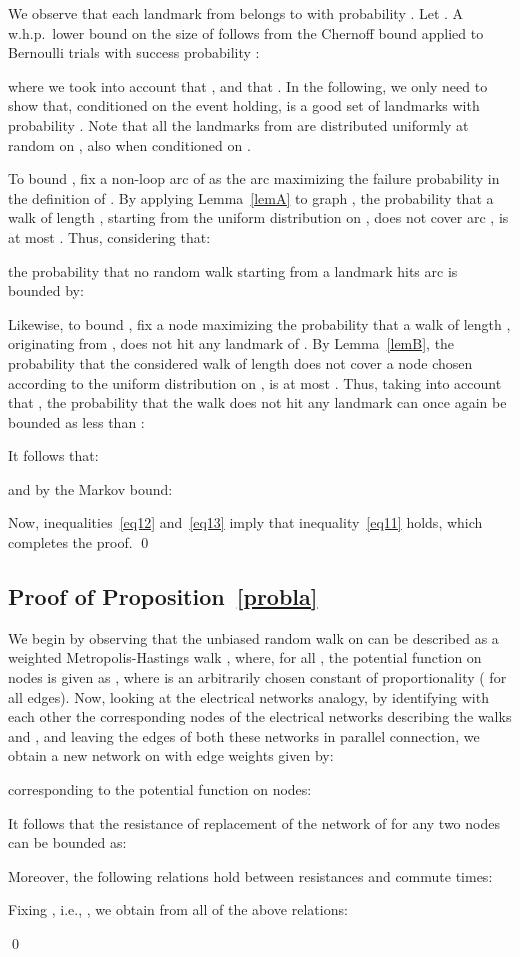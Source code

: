 \documentclass[11pt,a4paper]{article}
\renewcommand{\*}{\hspace*{5mm}}
\begin{document}
We observe that each landmark from  belongs to  with probability . Let . A w.h.p.\ lower bound on the size of  follows from the Chernoff bound applied to  Bernoulli trials with success probability :

where we took into account that , and that . In the following, we only need to show that, conditioned on the event  holding,  is a good set of landmarks with probability . Note that all the landmarks from  are distributed uniformly at random on , also when conditioned on .

To bound , fix a non-loop arc  of  as the arc maximizing the failure probability in the definition of . By applying Lemma~\ref{lemA} to graph , the probability that a walk  of length , starting from the uniform distribution on , does not cover arc , is at most . Thus, considering that:

the probability  that no random walk starting from a landmark hits arc  is bounded by:


Likewise, to bound , fix a node  maximizing the probability that a walk  of length , originating from , does not hit any landmark of . By Lemma~\ref{lemB}, the probability that the considered walk of length  does not cover a node chosen according to the uniform distribution on , is at most . Thus, taking into account that , the probability that the walk does not hit any landmark can once again be bounded as less than :

It follows that:

and by the Markov bound:

Now, inequalities~\eqref{eq12} and~\eqref{eq13} imply that inequality~\eqref{eq11} holds, which completes the proof.
\qed

\subsection*{Proof of Proposition~\ref{probla}}

We begin by observing that the unbiased random walk on  can be described as a weighted Metropolis-Hastings walk , where, for all , the potential function on nodes is given as , where  is an arbitrarily chosen constant of proportionality ( for all edges). Now, looking at the electrical networks analogy, by identifying with each other the corresponding nodes of the electrical networks describing the walks  and , and leaving the edges of both these networks in parallel connection, we obtain a new network on  with edge weights  given by:

corresponding to the potential function on nodes:

It follows that the resistance of replacement of the network of  for any two nodes  can be bounded as:

Moreover, the following relations hold between resistances and commute times:



Fixing , i.e., , we obtain from all of the above relations:

\qed
\end{document}

